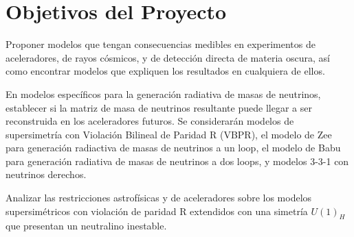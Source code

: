 \section{ Objetivos del Proyecto }

Proponer modelos que tengan consecuencias medibles en experimentos de aceleradores, de rayos cósmicos, y de detección directa de materia oscura, así como encontrar modelos que expliquen los resultados en cualquiera de ellos.

En modelos específicos para la generación radiativa de masas de neutrinos, establecer si la matriz de masa de neutrinos resultante puede llegar a ser reconstruida en los aceleradores futuros. Se considerarán modelos de supersimetría con Violación Bilineal de Paridad R (VBPR), el modelo de Zee para generación radiactiva de masas
de neutrinos a un loop, el modelo de Babu para generación radiativa de
masas de neutrinos a dos loops, y modelos 3-3-1 con neutrinos
derechos.

Analizar las restricciones astrofísicas y de aceleradores sobre los modelos supersimétricos
con violación de paridad R extendidos con una simetría $U(1)_H$ que presentan un neutralino inestable.



